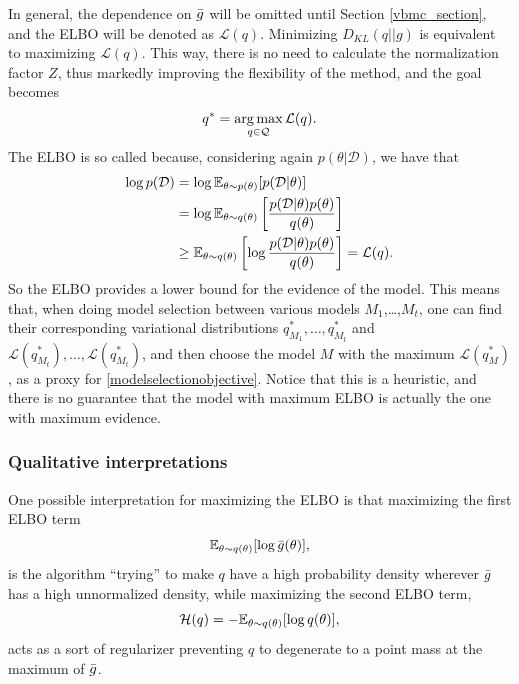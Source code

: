 In general, the dependence on ${\bar{g}}$ will be omitted until Section \ref{vbmc_section}, and the ELBO will be denoted as $\mathcal{L}(q)$. Minimizing $D_{KL}(q||g)$ is equivalent to maximizing $\mathcal{L}(q)$. This way, there is no need to calculate the normalization factor $Z$, thus markedly improving the flexibility of the method, and the goal becomes
\begin{equation}
q^* = \operatorname*{arg\,max}_{q \in \mathcal{Q}} \mathcal{L}(q).
\end{equation}
The ELBO is so called because, considering again $p(\theta|\mathcal{D})$, we have that 
\begin{equation}
\begin{split}
\log p(\mathcal{D}) & = \log {\mathbb E}_{\theta \sim p(\theta)} [p(\mathcal{D}|\theta)] \\
& = \log {\mathbb E}_{\theta \sim q(\theta)} \left[\frac{p(\mathcal{D}|\theta) p(\theta)}{q(\theta)} \right] \\
& \geq {\mathbb E}_{\theta \sim q(\theta)} \left[ \log \frac{p(\mathcal{D}|\theta) p(\theta)}{q(\theta)} \right] = \mathcal{L}(q).
\end{split}
\end{equation}
So the ELBO provides a lower bound for the evidence of the model. This means that, when doing model selection between various models $M_1$,\ldots,$M_t$, one can find their corresponding variational distributions $q^*_{M_1},\ldots,q^*_{M_t}$ and $\mathcal{L}(q^*_{M_t}),\ldots,\mathcal{L}(q^*_{M_t})$, and then choose the model $M$ with the maximum $\mathcal{L}(q^*_{M})$, as a proxy for \eqref{modelselectionobjective}. Notice that this is a heuristic, and there is no guarantee that the model with maximum ELBO is actually the one with maximum evidence.

\subsubsection{Qualitative interpretations}
One possible interpretation for maximizing the ELBO is that maximizing the first ELBO term 
\begin{equation}\label{elboterm1}
 {\mathbb E}_{\theta \sim q(\theta)}[\log {\bar{g}}(\theta)],
\end{equation}
is the algorithm \enquote{trying} to make $q$ have a high probability density wherever ${\bar{g}}$ has a high unnormalized density, while maximizing the second ELBO term,
\begin{equation}
 \mathcal{H}(q) = -{\mathbb E}_{\theta \sim q(\theta)}[\log q(\theta)],
\end{equation}
acts as a sort of regularizer preventing $q$ to degenerate to a point mass at the maximum of ${\bar{g}}$.

